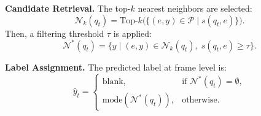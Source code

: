 \documentclass{article}
\begin{document}
\noindent\textbf{Candidate Retrieval.}
The top-$k$ nearest neighbors are selected:
\begin{equation}
\mathcal{N}_k(q_t) = \text{Top-}k\big(\{ (e,y) \in \mathcal{P} \mid s(q_t, e) \}\big).
\end{equation}
Then, a filtering threshold $\tau$ is applied:
\begin{equation}
\mathcal{N}^\ast(q_t) = \{ y \mid (e,y) \in \mathcal{N}_k(q_t), \; s(q_t,e) \geq \tau \}.
\end{equation}

\noindent\textbf{Label Assignment.}  
The predicted label at frame level is:
\begin{equation}
\hat{y}_t =
\begin{cases}
\text{blank}, & \text{if } \mathcal{N}^\ast(q_t) = \emptyset, \\
\mathrm{mode}(\mathcal{N}^\ast(q_t)), & \text{otherwise.}
\end{cases}
\end{equation}
\end{document}
